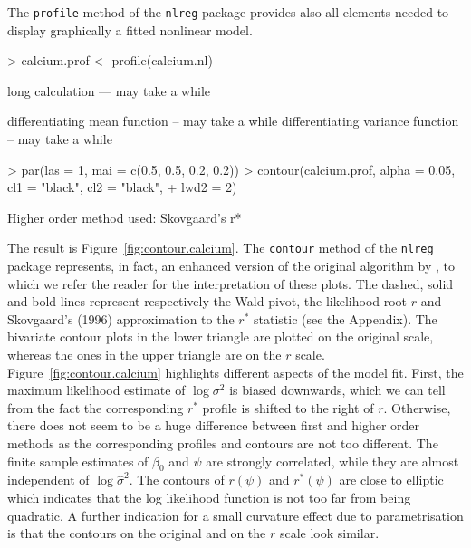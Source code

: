 \documentclass[a4paper,11pt]{article}
\def\code{\texttt}
\begin{document}
The \code{profile} method of the \code{nlreg} package provides also all elements needed to display graphically a fitted nonlinear model.
%
\begin{Schunk}
\begin{Sinput}
> calcium.prof <- profile(calcium.nl)
\end{Sinput}
\begin{Soutput}
long calculation --- may take a while

differentiating mean function -- may take a while
differentiating variance function -- may take a while
\end{Soutput}
\begin{Sinput}
> par(las = 1, mai = c(0.5, 0.5, 0.2, 0.2))
> contour(calcium.prof, alpha = 0.05, cl1 = "black", cl2 = "black", 
+     lwd2 = 2)
\end{Sinput}
\begin{Soutput}
Higher order method used: Skovgaard's r*
\end{Soutput}
\end{Schunk}
%
The result is Figure~\ref{fig:contour.calcium}.  The \code{contour} method of the \code{nlreg} package represents, in fact, an enhanced version of the original algorithm by \citet[Chapter~6]{bates.watts:1988}, to which we refer the reader for the interpretation of these plots.  The dashed, solid and bold lines represent respectively the Wald pivot, the likelihood root $r$ and Skovgaard's (1996) approximation to the $r^*$ statistic (see the Appendix).  The bivariate contour plots in the lower triangle are plotted on the original scale, whereas the ones in the upper triangle are on the $r$ scale.  Figure~\ref{fig:contour.calcium} highlights different aspects of the model fit.  First, the maximum likelihood estimate of $\log\sigma^2$ is biased downwards, which we can tell from the fact the corresponding $r^*$ profile is shifted to the right of $r$.  Otherwise, there does not seem to be a huge difference between first and higher order methods as the corresponding profiles and contours are not too different.  The finite sample estimates of $\beta_0$ and $\psi$ are strongly correlated, while they are almost independent of $\log\hat\sigma^2$.  The contours of $r(\psi)$ and $r^*(\psi)$ are close to elliptic which indicates that the log likelihood function is not too far from being quadratic.  A further indication for a small curvature effect due to parametrisation is that the contours on the original and on the $r$ scale look similar. 
\end{document}
